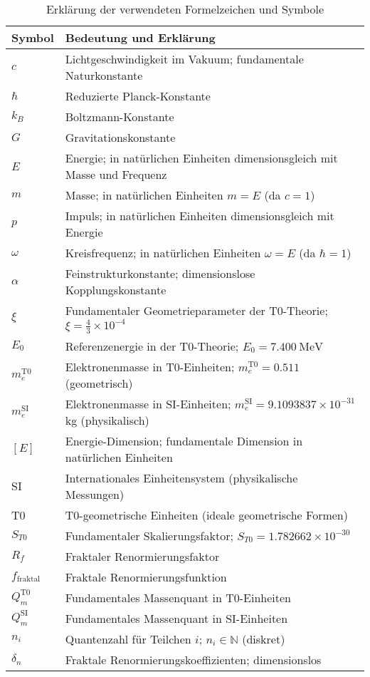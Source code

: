 \documentclass[12pt,a4paper]{article}
\begin{document}
	\begin{table}[h]
		\centering
		\begin{tabular}{p{3cm}p{10cm}}
			\toprule
			\textbf{Symbol} & \textbf{Bedeutung und Erklärung} \\
			\midrule
			$c$ & Lichtgeschwindigkeit im Vakuum; fundamentale Naturkonstante \\
			$\hbar$ & Reduzierte Planck-Konstante \\
			$k_B$ & Boltzmann-Konstante \\
			$G$ & Gravitationskonstante \\
			$E$ & Energie; in natürlichen Einheiten dimensionsgleich mit Masse und Frequenz \\
			$m$ & Masse; in natürlichen Einheiten $m = E$ (da $c=1$) \\
			$p$ & Impuls; in natürlichen Einheiten dimensionsgleich mit Energie \\
			$\omega$ & Kreisfrequenz; in natürlichen Einheiten $\omega = E$ (da $\hbar=1$) \\
			$\alpha$ & Feinstrukturkonstante; dimensionslose Kopplungskonstante \\
			$\xi$ & Fundamentaler Geometrieparameter der T0-Theorie; $\xi = \frac{4}{3} \times 10^{-4}$ \\
			$E_0$ & Referenzenergie in der T0-Theorie; $E_0 = 7.400~\mathrm{MeV}$ \\
			$m_e^{\mathrm{T0}}$ & Elektronenmasse in T0-Einheiten; $m_e^{\mathrm{T0}} = 0.511$ (geometrisch) \\
			$m_e^{\mathrm{SI}}$ & Elektronenmasse in SI-Einheiten; $m_e^{\mathrm{SI}} = 9.1093837\times 10^{-31}$ kg (physikalisch) \\
			$[E]$ & Energie-Dimension; fundamentale Dimension in natürlichen Einheiten \\
			SI & Internationales Einheitensystem (physikalische Messungen) \\
			T0 & T0-geometrische Einheiten (ideale geometrische Formen) \\
			$S_{T0}$ & Fundamentaler Skalierungsfaktor; $S_{T0} = 1.782662 \times 10^{-30}$ \\
			$R_f$ & Fraktaler Renormierungsfaktor \\
			$f_{\text{fraktal}}$ & Fraktale Renormierungsfunktion \\
			$Q_m^{\mathrm{T0}}$ & Fundamentales Massenquant in T0-Einheiten \\
			$Q_m^{\mathrm{SI}}$ & Fundamentales Massenquant in SI-Einheiten \\
			$n_i$ & Quantenzahl für Teilchen $i$; $n_i \in \mathbb{N}$ (diskret) \\
			$\delta_n$ & Fraktale Renormierungskoeffizienten; dimensionslos \\
			\bottomrule
		\end{tabular}
		\caption{Erklärung der verwendeten Formelzeichen und Symbole}
	\end{table}
	
\end{document}
